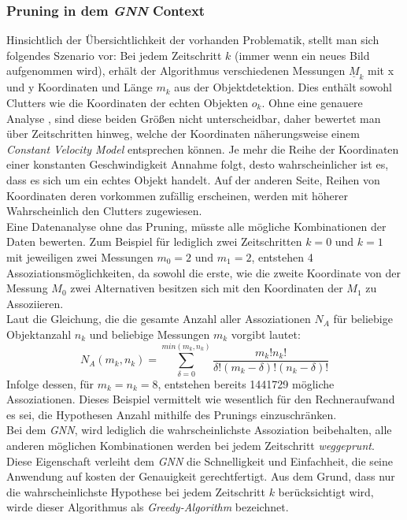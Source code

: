 \documentclass[10pt,a4paper]{article}
\begin{document}
\subsubsection{Pruning in dem \textit{GNN} Context}
Hinsichtlich der Übersichtlichkeit der vorhanden Problematik, stellt man sich folgendes Szenario vor: Bei jedem Zeitschritt $k$ (immer wenn ein neues Bild aufgenommen wird), erhält der Algorithmus verschiedenen Messungen $\underline{M}_k$ mit x und y Koordinaten und Länge $m_k$ aus der Objektdetektion. Dies enthält sowohl Clutters wie die Koordinaten der echten Objekten $o_k$. Ohne eine genauere Analyse , sind diese beiden Größen nicht unterscheidbar, daher bewertet man über Zeitschritten hinweg, welche der Koordinaten näherungsweise einem \textit{Constant Velocity Model} entsprechen können. Je mehr die Reihe der Koordinaten einer konstanten Geschwindigkeit Annahme folgt, desto wahrscheinlicher ist es, dass es sich um ein echtes Objekt handelt. Auf der anderen Seite, Reihen von 
Koordinaten deren vorkommen zufällig erscheinen, werden mit höherer Wahrscheinlich den Clutters zugewiesen.\\
Eine Datenanalyse ohne das Pruning, müsste alle mögliche Kombinationen der Daten bewerten. Zum Beispiel für lediglich zwei Zeitschritten $k =0$ und $k=1$ mit jeweiligen zwei Messungen  $m_0 = 2$ und $m_1 = 2$, entstehen 4 Assoziationsmöglichkeiten, da sowohl die erste, wie die zweite Koordinate von der Messung $M_0$ zwei Alternativen besitzen sich mit den Koordinaten der $M_1$ zu Assoziieren.\\
Laut \cite{MOTyoutube} die Gleichung, die die gesamte Anzahl aller Assoziationen $N_A$ für beliebige Objektanzahl $n_k$ und beliebige Messungen $m_k$ vorgibt lautet:
\begin{equation}
N_A(m_k,n_k) = \sum_{\delta=0}^{min(m_k,n_k)}\dfrac{m_k!n_k!}{\delta!(m_k-\delta)!(n_k-\delta)!}
\end{equation}
Infolge dessen, für $m_k=n_k = 8$, entstehen bereits 1441729 mögliche Assoziationen. Dieses Beispiel vermittelt wie wesentlich für den Rechneraufwand es sei, die Hypothesen Anzahl mithilfe des Prunings einzuschränken. \\
Bei dem \textit{GNN}, wird lediglich die wahrscheinlichste Assoziation beibehalten, alle anderen möglichen Kombinationen werden bei jedem Zeitschritt \textit{weggeprunt}. Diese Eigenschaft verleiht dem \textit{GNN} die Schnelligkeit und Einfachheit, die seine Anwendung auf kosten der Genauigkeit gerechtfertigt. Aus dem Grund, dass nur die wahrscheinlichste Hypothese bei jedem Zeitschritt $k$ berücksichtigt wird, wirde dieser Algorithmus als \textit{Greedy-Algorithm} bezeichnet. \\
\end{document}
